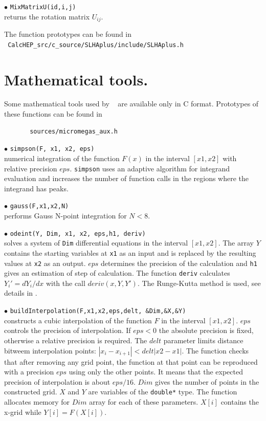 \documentclass[12pt,a4paper]{article}
\begin{document}
\noindent
$\bullet$ \verb|MixMatrixU(id,i,j)|\\
returns the rotation matrix $U_{ij}$.

The function prototypes can be found in \\
\noindent
\verb| CalcHEP_src/c_source/SLHAplus/include/SLHAplus.h|

\section{Mathematical tools.}

Some mathematical tools used by \micro~ are available only 
in C format. Prototypes of these functions can be found in
\begin{verbatim}
       sources/micromegas_aux.h 
\end{verbatim}

\noindent$\bullet$ \verb|simpson(F, x1, x2, eps)|\\
numerical integration of the function $F(x)$ in the interval $[x1,x2]$  
with relative precision $eps$. \verb|simpson| uses an adaptive algorithm 
for integrand evaluation and increases the number of function calls in 
the regions where the  integrand has peaks. 

\noindent$\bullet$ \verb|gauss(F,x1,x2,N)|\\
performs Gauss N-point integration for $N<8$.  

\noindent$\bullet$ \verb|odeint(Y, Dim, x1, x2, eps,h1, deriv)|\\
solves a  system of \verb|Dim| differential  equations in the interval 
$[x1,x2]$. The array $Y$ contains the starting variables at \verb|x1| as an input and is replaced by the
resulting values at \verb|x2| as an output. $eps$ determines the precision of the 
calculation and  \verb|h1| gives an estimation of step of calculation.  
The function \verb|deriv| calculates 
$Y_i' = dY_i/dx$ with the call $deriv(x,Y,Y')$. The Runge-Kutta method is
used, see details in \cite{Numerical}.  

\noindent$\bullet$ \verb|buildInterpolation(F,x1,x2,eps,delt, &Dim,&X,&Y)|\\
constructs  a cubic interpolation of the function $F$ in the interval $[x1,x2]$.
$eps$ controls the precision of interpolation. If $eps < 0$ the absolute 
precision is fixed, otherwise a relative precision is required.
The $delt$ parameter limits distance bitweem interpolation points: $|x_i
-x_{i+1}|<delt|x2-x1|$.  
The function checks that after removing any grid point, the function at that point
can be reproduced with a precision $eps$ using only the other points.  It means that
the expected precision of interpolation is about $eps/16$. $Dim$ gives the number 
of points in the  constructed grid. $X$ and $Y$ are variables of the  
\verb|double*| type. The function allocates memory for $Dim$ array for each 
 of these parameters. $X[i]$ contains the x-grid while $Y[i]=F(X[i])$.
\end{document}
